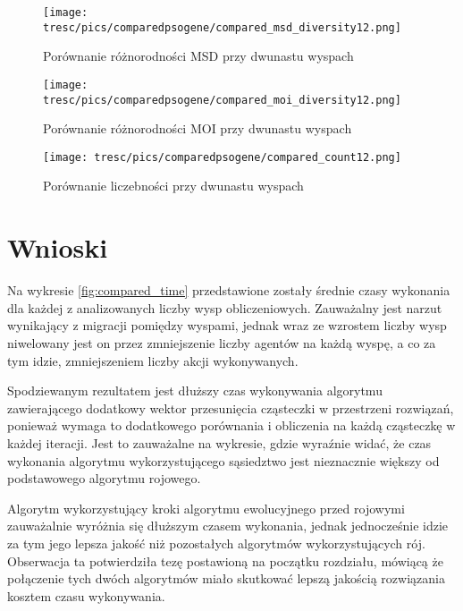 \begin{figure}[H]
\begin{center} 
\texttt{[image: tresc/pics/comparedpsogene/compared\_msd\_diversity12.png]}
\caption{Porównanie różnorodności MSD przy dwunastu wyspach}
\label{fig:compared_msd_diversity12}
\end{center}
\end{figure}

\begin{figure}[H]
\begin{center} 
\texttt{[image: tresc/pics/comparedpsogene/compared\_moi\_diversity12.png]}
\caption{Porównanie różnorodności MOI przy dwunastu wyspach}
\label{fig:compared_moi_diversity12}
\end{center}
\end{figure}

\begin{figure}[H]
\begin{center} 
\texttt{[image: tresc/pics/comparedpsogene/compared\_count12.png]}
\caption{Porównanie liczebności przy dwunastu wyspach}
\label{fig:compared_count12}
\end{center}
\end{figure}



\section{Wnioski}

Na wykresie \ref{fig:compared_time} przedstawione zostały średnie czasy wykonania dla każdej z analizowanych liczby wysp obliczeniowych.  Zauważalny jest narzut wynikający z migracji pomiędzy wyspami, jednak wraz ze wzrostem liczby wysp niwelowany jest on przez zmniejszenie liczby agentów na każdą wyspę, a co za tym idzie, zmniejszeniem liczby akcji wykonywanych.

Spodziewanym rezultatem jest dłuższy czas wykonywania algorytmu zawierającego dodatkowy wektor przesunięcia cząsteczki w przestrzeni rozwiązań, ponieważ wymaga to dodatkowego porównania i obliczenia na każdą cząsteczkę w każdej iteracji. Jest to zauważalne na wykresie, gdzie wyraźnie widać, że czas wykonania algorytmu wykorzystującego sąsiedztwo jest nieznacznie większy od podstawowego algorytmu rojowego.

Algorytm wykorzystujący kroki algorytmu ewolucyjnego przed rojowymi zauważalnie wyróżnia się dłuższym czasem wykonania, jednak jednocześnie idzie za tym jego lepsza jakość niż pozostałych algorytmów wykorzystujących rój. Obserwacja ta potwierdziła tezę postawioną na początku rozdziału, mówiącą że połączenie tych dwóch algorytmów miało skutkować lepszą jakością rozwiązania kosztem czasu wykonywania.


